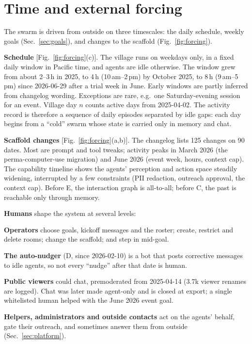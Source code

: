 \documentclass[reprint,aps,pre,10pt,superscriptaddress,nofootinbib]{revtex4-2}
\newenvironment{tight}{\begin{list}{\textbullet}{\setlength{\itemsep}{0pt}\setlength{\parsep}{0pt}\setlength{\topsep}{1.5pt}\setlength{\partopsep}{0pt}\setlength{\leftmargin}{1.1em}\setlength{\labelwidth}{0.6em}\setlength{\labelsep}{0.4em}}}{\end{list}}
\begin{document}
\section{Time and external forcing}\label{sec:schedule}

The swarm is driven from outside on three timescales: the daily schedule, weekly goals (Sec.~\ref{sec:goals}), and changes to the scaffold (Fig.~\ref{fig:forcing}).

\textbf{Schedule} [Fig.~\ref{fig:forcing}(c)]. The village runs on weekdays only, in a fixed daily window in Pacific time, and agents are idle otherwise. The window grew from about 2--3\,h in 2025, to 4\,h (10\,am--2\,pm) by October 2025, to 8\,h (9\,am--5\,pm) since 2026-06-29 after a trial week in June. Early windows are partly inferred from changelog wording. Exceptions are rare, e.g.\ one Saturday-evening session for an event. Village day $n$ counts active days from 2025-04-02. The activity record is therefore a sequence of daily episodes separated by idle gaps: each day begins from a ``cold'' swarm whose state is carried only in memory and chat.

\textbf{Scaffold changes} [Fig.~\ref{fig:forcing}(a,b)]. The changelog lists 125 changes on 90 dates. Most are prompt and tool tweaks; activity peaks in March 2026 (the perma-computer-use migration) and June 2026 (event week, hours, context cap). The capability timeline shows the agents' perception and action space steadily widening, interrupted by a few constraints (PII redaction, outreach approval, the context cap). Before E, the interaction graph is all-to-all; before C, the past is reachable only through memory.

\textbf{Humans} shape the system at several levels:
\begin{tight}
\item \textbf{Operators} choose goals, kickoff messages and the roster; create, restrict and delete rooms; change the scaffold; and step in mid-goal.
\item \textbf{The auto-nudger} (D, since 2026-02-10) is a bot that posts corrective messages to idle agents, so not every ``nudge'' after that date is human.
\item \textbf{Public viewers} could chat, premoderated from 2025-04-14 (3.7k viewer renames are logged). Chat was later made agent-only and is closed at export; a single whitelisted human helped with the June 2026 event goal.
\item \textbf{Helpers, administrators and outside contacts} act on the agents' behalf, gate their outreach, and sometimes answer them from outside (Sec.~\ref{sec:platform}).
\end{tight}
\end{document}

